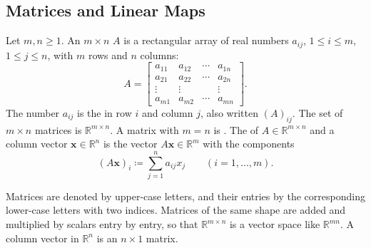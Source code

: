 \subsection{Matrices and Linear Maps}

\begin{definition}[Matrix]
\label{def:matrix}
Let $m,n\ge1$. An $m\times n$  $A$ is a rectangular array of real numbers $a_{ij}$, $1\le i\le m$, $1\le j\le n$, with $m$ rows and $n$ columns:
\[
A=\begin{bmatrix}a_{11}&a_{12}&\cdots&a_{1n}\\a_{21}&a_{22}&\cdots&a_{2n}\\\vdots&\vdots&&\vdots\\a_{m1}&a_{m2}&\cdots&a_{mn}\end{bmatrix}.
\]
The number $a_{ij}$ is the  in row $i$ and column $j$, also written $(A)_{ij}$. The set of $m\times n$ matrices is $\mathbb R^{m\times n}$. A matrix with $m=n$ is . The  of $A\in\mathbb R^{m\times n}$ and a column vector $\mathbf x\in\mathbb R^n$ is the vector $A\mathbf x\in\mathbb R^m$ with the components
\[
(A\mathbf x)_i\coloneqq\sum_{j=1}^na_{ij}x_j\qquad(i=1,\ldots,m).
\]
\end{definition}

Matrices are denoted by upper-case letters, and their entries by the corresponding lower-case letters with two indices. Matrices of the same shape are added and multiplied by scalars entry by entry, so that $\mathbb R^{m\times n}$ is a vector space like $\mathbb R^{mn}$. A column vector in $\mathbb R^n$ is an $n\times1$ matrix.

